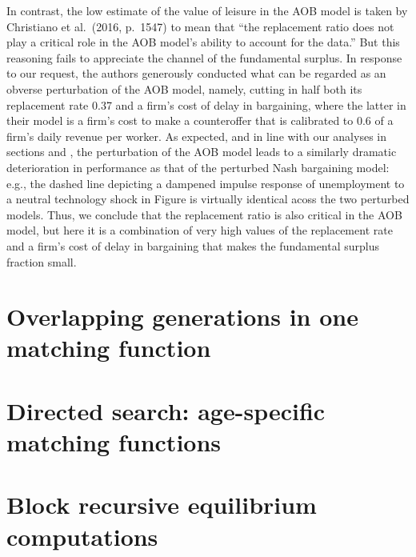 In contrast, the low estimate of the value of leisure in the
AOB model is taken by Christiano et al.\ (2016, p.~1547)
to mean that ``the replacement ratio does not play a critical role
in the AOB model's ability to account for the data.''
But this reasoning fails to appreciate the channel
of the fundamental surplus. In response to our request,
the authors generously conducted what can be regarded as an
obverse perturbation of the AOB model, namely, cutting in half
both its replacement rate 0.37 and a firm's cost of delay
in bargaining, where the latter in their model is a firm's
cost to make a counteroffer that is calibrated to 0.6 of a firm's
daily revenue per worker.
As expected, and in line with our analyses in sections
 and , the
perturbation of the AOB model leads to a similarly dramatic
deterioration in performance as that of the perturbed Nash
bargaining model: e.g., the dashed line depicting a
dampened impulse response of unemployment to a neutral
technology shock in Figure  
is virtually identical acoss the two perturbed models. Thus,
we conclude that the replacement ratio is also critical
in the AOB model, but here it is a combination of very high
values of the replacement rate and a firm's cost of delay in
bargaining that makes the fundamental surplus fraction small.




\section{Overlapping generations in one matching function}


\section{Directed search: age-specific matching functions}


\section{Block recursive equilibrium computations}


